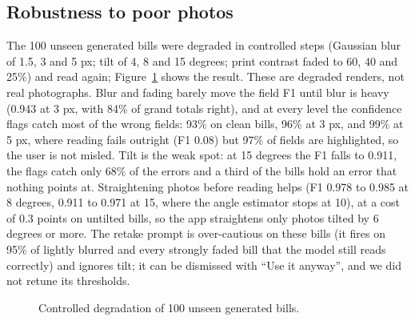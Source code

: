 \documentclass[10pt,a4paper]{article}
\begin{document}
\begin{table}[!ht]
\centering\small

\caption{Before and after fine-tuning on bills not used anywhere in training or selection.}\label{tab:ba}
\end{table}


\subsection{Robustness to poor photos}
The 100 unseen generated bills were degraded in controlled steps (Gaussian blur of 1.5, 3 and 5 px; tilt of 4, 8 and 15 degrees; print contrast faded to 60, 40 and 25\%) and read again; Figure~\ref{fig:deg} shows the result. These are degraded renders, not real photographs. Blur and fading barely move the field F1 until blur is heavy (0.943 at 3 px, with 84\% of grand totals right), and at every level the confidence flags catch most of the wrong fields: 93\% on clean bills, 96\% at 3 px, and 99\% at 5 px, where reading fails outright (F1 0.08) but 97\% of fields are highlighted, so the user is not misled. Tilt is the weak spot: at 15 degrees the F1 falls to 0.911, the flags catch only 68\% of the errors and a third of the bills hold an error that nothing points at. Straightening photos before reading helps (F1 0.978 to 0.985 at 8 degrees, 0.911 to 0.971 at 15, where the angle estimator stops at 10), at a cost of 0.3 points on untilted bills, so the app straightens only photos tilted by 6 degrees or more. The retake prompt is over-cautious on these bills (it fires on 95\% of lightly blurred and every strongly faded bill that the model still reads correctly) and ignores tilt; it can be dismissed with ``Use it anyway'', and we did not retune its thresholds.


\begin{figure}[!ht]
\centering
{}
\caption{Controlled degradation of 100 unseen generated bills.}\label{fig:deg}
\end{figure}
\end{document}
